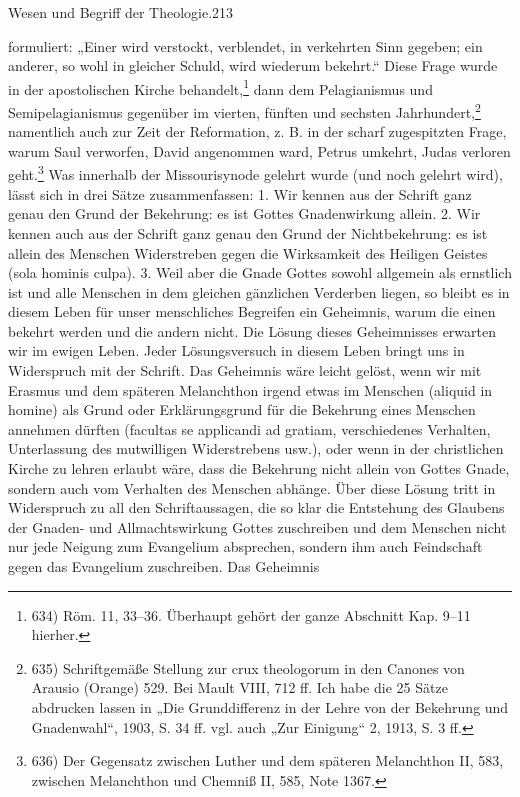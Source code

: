 Wesen und Begriff der Theologie.\hspace*{\fill}213
\par
formuliert: „Einer wird verstockt, verblendet, in verkehrten Sinn gegeben; ein anderer, so wohl in gleicher Schuld, wird wiederum bekehrt.“ Diese Frage wurde in der apostolischen Kirche behandelt,\footnote{634) Röm. 11, 33--36. Überhaupt gehört der ganze Abschnitt Kap. 9--11 hierher.} dann dem Pelagianismus und Semipelagianismus gegenüber im vierten, fünften und sechsten Jahrhundert,\footnote{635) Schriftgemäße Stellung zur crux theologorum in den Canones von Arausio (Orange) 529. Bei Mault VIII, 712 ff. Ich habe die 25 Sätze abdrucken lassen in „Die Grunddifferenz in der Lehre von der Bekehrung und Gnadenwahl“, 1903, S. 34 ff. vgl. auch „Zur Einigung“ 2, 1913, S. 3 ff.} namentlich auch zur Zeit der Reformation, z. B. in der scharf zugespitzten Frage, warum Saul verworfen, David angenommen ward, Petrus umkehrt, Judas verloren geht.\footnote{636) Der Gegensatz zwischen Luther und dem späteren Melanchthon II, 583, zwischen Melanchthon und Chemniß II, 585, Note 1367.} Was innerhalb der Missourisynode gelehrt wurde (und noch gelehrt wird), lässt sich in drei Sätze zusammenfassen: 1. Wir kennen aus der Schrift ganz genau den Grund der Bekehrung: es ist Gottes Gnadenwirkung allein. 2. Wir kennen auch aus der Schrift ganz genau den Grund der Nichtbekehrung: es ist allein des Menschen Widerstreben gegen die Wirksamkeit des Heiligen Geistes (sola hominis culpa). 3. Weil aber die Gnade Gottes sowohl allgemein als ernstlich ist und alle Menschen in dem gleichen gänzlichen Verderben liegen, so bleibt es in diesem Leben für unser menschliches Begreifen ein Geheimnis, warum die einen bekehrt werden und die andern nicht. Die Lösung dieses Geheimnisses erwarten wir im ewigen Leben. Jeder Lösungsversuch in diesem Leben bringt uns in Widerspruch mit der Schrift. Das Geheimnis wäre leicht gelöst, wenn wir mit Erasmus und dem späteren Melanchthon irgend etwas im Menschen (aliquid in homine) als Grund oder Erklärungsgrund für die Bekehrung eines Menschen annehmen dürften (facultas se applicandi ad gratiam, verschiedenes Verhalten, Unterlassung des mutwilligen Widerstrebens usw.), oder wenn in der christlichen Kirche zu lehren erlaubt wäre, dass die Bekehrung nicht allein von Gottes Gnade, sondern auch vom Verhalten des Menschen abhänge. Über diese Lösung tritt in Widerspruch zu all den Schriftaussagen, die so klar die Entstehung des Glaubens der Gnaden- und Allmachtswirkung Gottes zuschreiben und dem Menschen nicht nur jede Neigung zum Evangelium absprechen, sondern ihm auch Feindschaft gegen das Evangelium zuschreiben. Das Geheimnis